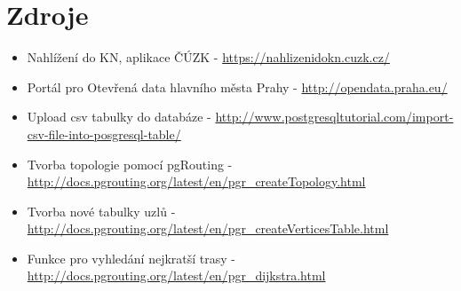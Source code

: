 \documentclass[a4paper, 12pt]{article}
\begin{document}
\newpage
\section{Zdroje}

\begin{itemize}
\item Nahlížení do KN, aplikace ČÚZK - \url{https://nahlizenidokn.cuzk.cz/} 

\item Portál pro Otevřená data hlavního města Prahy - \url{http://opendata.praha.eu/}

\item Upload csv tabulky do databáze - \url{http://www.postgresqltutorial.com/import-csv-file-into-posgresql-table/}

\item Tvorba topologie pomocí pgRouting - \url{http://docs.pgrouting.org/latest/en/pgr\_createTopology.html}

\item Tvorba nové tabulky uzlů - \url{http://docs.pgrouting.org/latest/en/pgr\_createVerticesTable.html}

\item Funkce pro vyhledání nejkratší trasy - \url{http://docs.pgrouting.org/latest/en/pgr\_dijkstra.html}

\end{itemize}
\end{document}
